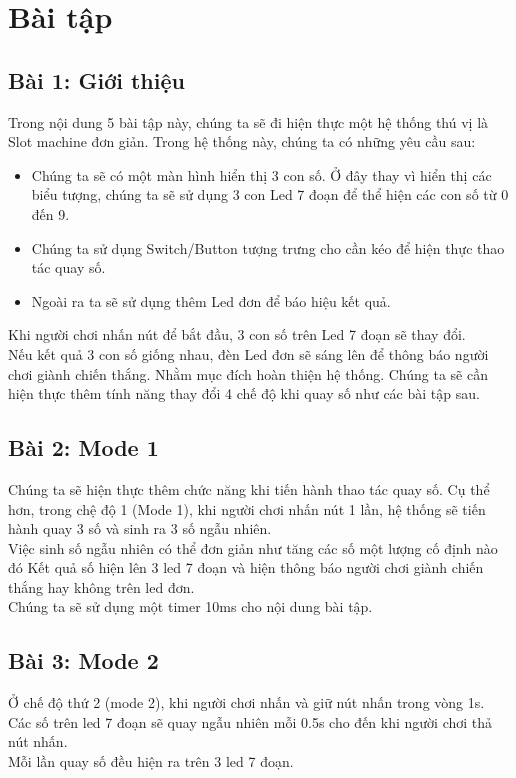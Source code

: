 \section{Bài tập}

\subsection{Bài 1: Giới thiệu}
 Trong nội dung 5 bài tập này, chúng ta sẽ đi hiện thực một hệ thống thú vị là Slot machine đơn giản.
 Trong hệ thống này, chúng ta có những yêu cầu sau:
 \begin{itemize}
    \item Chúng ta sẽ có một màn hình hiển thị 3 con số. Ở đây thay vì hiển thị các biểu tượng, chúng ta sẽ sử dụng 3 con Led 7 đoạn để thể hiện các con số từ 0 đến 9.
    \item  Chúng ta sử dụng Switch/Button tượng trưng cho cần kéo để hiện thực thao tác quay số.
    \item Ngoài ra ta sẽ sử dụng thêm Led đơn để báo hiệu kết quả.
\end{itemize}
 Khi người chơi nhấn nút để bắt đầu, 3 con số trên Led 7 đoạn sẽ thay đổi.
 \\Nếu kết quả 3 con số giống nhau, đèn Led đơn sẽ sáng lên để thông báo người chơi giành chiến thắng.
 \newline
Nhằm mục đích hoàn thiện hệ thống. Chúng ta sẽ cần hiện thực thêm tính năng thay đổi 4 chế độ khi quay số như các bài tập sau.
\subsection{Bài 2: Mode 1}
Chúng ta sẽ hiện thực thêm chức năng khi tiến hành thao tác quay số.
Cụ thể hơn, trong chệ độ 1 (Mode 1), khi người chơi nhấn nút 1 lần, hệ thống sẽ tiến hành quay 3 số và sinh ra 3 số ngẫu nhiên.
\\Việc sinh số ngẫu nhiên có thể đơn giản như tăng các số một lượng cố định nào đó
Kết quả số hiện lên 3 led 7 đoạn và hiện thông báo người chơi giành chiến thắng hay không trên led đơn.
\\Chúng ta sẽ sử dụng một timer 10ms cho nội dung bài tập.
\subsection{Bài 3: Mode 2}
Ở chế độ thứ 2 (mode 2), khi người chơi nhấn và giữ nút nhấn trong vòng 1s.
\\Các số trên led 7 đoạn sẽ quay ngẫu nhiên mỗi 0.5s cho đến khi người chơi thả nút nhấn. 
\\Mỗi lần quay số đều hiện ra trên 3 led 7 đoạn.
